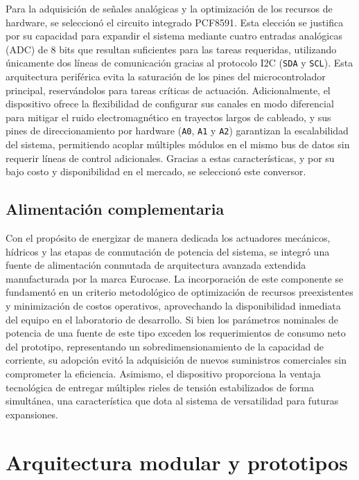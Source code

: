Para la adquisición de señales analógicas y la optimización de los recursos de hardware, se seleccionó el circuito integrado PCF8591. Esta elección se justifica por su capacidad para expandir el sistema mediante cuatro entradas analógicas (ADC) de 8 bits que resultan suficientes para las tareas requeridas, utilizando únicamente dos líneas de comunicación gracias al protocolo I2C (\texttt{SDA} y \texttt{SCL}). Esta arquitectura periférica evita la saturación de los pines del microcontrolador principal, reservándolos para tareas críticas de actuación. Adicionalmente, el dispositivo ofrece la flexibilidad de configurar sus canales en modo diferencial para mitigar el ruido electromagnético en trayectos largos de cableado, y sus pines de direccionamiento por hardware (\texttt{A0}, \texttt{A1} y \texttt{A2}) garantizan la escalabilidad del sistema, permitiendo acoplar múltiples módulos en el mismo bus de datos sin requerir líneas de control adicionales. Gracias a estas características, y por su bajo costo y disponibilidad en el mercado, se seleccionó este conversor.

\subsection{Alimentación complementaria}
\label{subsec:alimentacion_complementaria}

Con el propósito de energizar de manera dedicada los actuadores mecánicos, hídricos y las etapas de conmutación de potencia del sistema, se integró una fuente de alimentación conmutada de arquitectura avanzada extendida manufacturada por la marca Eurocase. La incorporación de este componente se fundamentó en un criterio metodológico de optimización de recursos preexistentes y minimización de costos operativos, aprovechando la disponibilidad inmediata del equipo en el laboratorio de desarrollo. Si bien los parámetros nominales de potencia de una fuente de este tipo exceden los requerimientos de consumo neto del prototipo, representando un sobredimensionamiento de la capacidad de corriente, su adopción evitó la adquisición de nuevos suministros comerciales sin comprometer la eficiencia. Asimismo, el dispositivo proporciona la ventaja tecnológica de entregar múltiples rieles de tensión estabilizados de forma simultánea, una característica que dota al sistema de versatilidad para futuras expansiones.

\section{Arquitectura modular y prototipos}
\label{sec:arquitectura_modular_prototipos}

